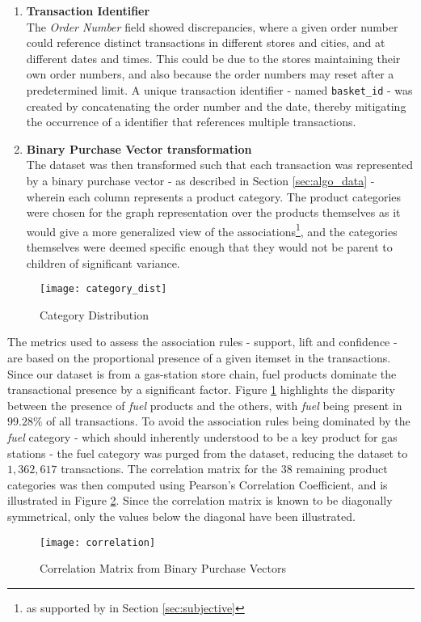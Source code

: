 \begin{enumerate}
\item \textbf{Transaction Identifier}\\
The \textit{Order Number} field showed discrepancies, where a given order number could reference distinct transactions in different stores and cities, and at different dates and times. 
This could be due to the stores maintaining their own order numbers, and also because the order numbers may reset after a predetermined limit.
A unique transaction identifier - named \texttt{basket\_id} - was created by concatenating the order number and the date, thereby mitigating the occurrence of a identifier that references multiple transactions.

\item \textbf{Binary Purchase Vector transformation}\\
The dataset was then transformed such that each transaction was represented by a binary purchase vector - as described in Section \ref{sec:algo_data} - wherein each column represents a product category. The product categories were chosen for the graph representation over the products themselves as it would give a more generalized view of the associations\footnote{as supported by  in Section \ref{sec:subjective}}, and the categories themselves were deemed specific enough that they would not be parent to children of significant variance.
\end{enumerate} 
\begin{figure}[H]
\centering
\texttt{[image: category\_dist]}
\caption{Category Distribution}
\label{fig:cat_dist}
\end{figure}
The metrics used to assess the association rules - support, lift and confidence - are based on the proportional presence of a given itemset in the transactions. Since our dataset is from a gas-station store chain, fuel products dominate the transactional presence by a significant factor. Figure \ref{fig:cat_dist} highlights the disparity between the presence of \textit{fuel} products and the others, with \textit{fuel} being present in $99.28\%$ of all transactions. To avoid the association rules being dominated by the \textit{fuel} category - which should inherently understood to be a key product for gas stations - the fuel category was purged from the dataset, reducing the dataset to $1,362,617$ transactions.
The correlation matrix for the $38$ remaining product categories was then computed using Pearson's Correlation Coefficient, and is illustrated in Figure \ref{fig:correlation}. Since the correlation matrix is known to be diagonally symmetrical, only the values below the diagonal have been illustrated.
\begin{figure}[H]
\centering
\texttt{[image: correlation]}
\caption{Correlation Matrix from Binary Purchase Vectors}
\label{fig:correlation}
\end{figure}


